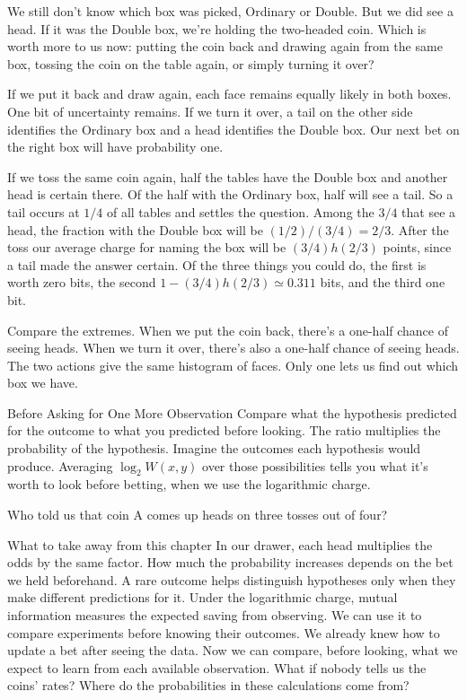 We still don't know which box was picked, Ordinary or Double. But we did see a head. If it was the Double box, we're holding the two-headed coin. Which is worth more to us now: putting the coin back and drawing again from the same box, tossing the coin on the table again, or simply turning it over?

If we put it back and draw again, each face remains equally likely in both boxes. One bit of uncertainty remains. If we turn it over, a tail on the other side identifies the Ordinary box and a head identifies the Double box. Our next bet on the right box will have probability one.

If we toss the same coin again, half the tables have the Double box and another head is certain there. Of the half with the Ordinary box, half will see a tail. So a tail occurs at $1/4$ of all tables and settles the question. Among the $3/4$ that see a head, the fraction with the Double box will be $(1/2)/(3/4)=2/3$. After the toss our average charge for naming the box will be $(3/4)h(2/3)$ points, since a tail made the answer certain. Of the three things you could do, the first is worth zero bits, the second $1-(3/4)h(2/3)\simeq0.311$ bits, and the third one bit.

Compare the extremes. When we put the coin back, there's a one-half chance of seeing heads. When we turn it over, there's also a one-half chance of seeing heads. The two actions give the same histogram of faces. Only one lets us find out which box we have.

\begin{quadro}{Before Asking for One More Observation}
 Compare what the hypothesis predicted for the outcome to what you predicted before looking. The ratio multiplies the probability of the hypothesis.
 Imagine the outcomes each hypothesis would produce. Averaging $\log_2 W(x,y)$ over those possibilities tells you what it's worth to look before betting, when we use the logarithmic charge.
\end{quadro}

Who told us that coin A comes up heads on three tosses out of four?

\begin{quadro}{What to take away from this chapter}
 In our drawer, each head multiplies the odds by the same factor. How much the probability increases depends on the bet we held beforehand.
 A rare outcome helps distinguish hypotheses only when they make different predictions for it.
 Under the logarithmic charge, mutual information measures the expected saving from observing. We can use it to compare experiments before knowing their outcomes.
 We already knew how to update a bet after seeing the data. Now we can compare, before looking, what we expect to learn from each available observation.
 What if nobody tells us the coins' rates? Where do the probabilities in these calculations come from?
\end{quadro}

